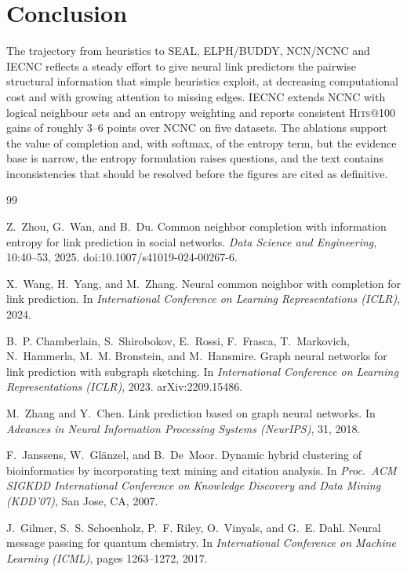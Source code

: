 \documentclass[11pt,a4paper]{article}
\makeatletter
\newcommand{\hits}{\textsc{Hits}@100}
\makeatother
\begin{document}
\section{Conclusion}
The trajectory from heuristics to SEAL, ELPH/BUDDY, NCN/NCNC and IECNC reflects a steady effort to give neural link predictors
the pairwise structural information that simple heuristics exploit, at decreasing computational cost
and with growing attention to missing edges. IECNC extends NCNC with logical neighbour sets and an entropy
weighting and reports consistent \hits{} gains of roughly 3--6 points over NCNC on five datasets. The ablations support the value of
completion and, with softmax, of the entropy term, but the evidence base is narrow, the entropy formulation raises
questions, and the text contains inconsistencies that should be resolved before the figures are cited as definitive.

\begin{thebibliography}{99}\small
\setlength{\itemsep}{0.2em}

Z.~Zhou, G.~Wan, and B.~Du.
\newblock Common neighbor completion with information entropy for link prediction in social networks.
\newblock \emph{Data Science and Engineering}, 10:40--53, 2025.
\newblock doi:10.1007/s41019-024-00267-6.

X.~Wang, H.~Yang, and M.~Zhang.
\newblock Neural common neighbor with completion for link prediction.
\newblock In \emph{International Conference on Learning Representations (ICLR)}, 2024.

B.~P. Chamberlain, S.~Shirobokov, E.~Rossi, F.~Frasca, T.~Markovich, N.~Hammerla, M.~M. Bronstein, and M.~Hansmire.
\newblock Graph neural networks for link prediction with subgraph sketching.
\newblock In \emph{International Conference on Learning Representations (ICLR)}, 2023.
\newblock arXiv:2209.15486.

M.~Zhang and Y.~Chen.
\newblock Link prediction based on graph neural networks.
\newblock In \emph{Advances in Neural Information Processing Systems (NeurIPS)}, 31, 2018.

F.~Janssens, W.~Gl\"anzel, and B.~De~Moor.
\newblock Dynamic hybrid clustering of bioinformatics by incorporating text mining and citation analysis.
\newblock In \emph{Proc.\ ACM SIGKDD International Conference on Knowledge Discovery and Data Mining (KDD'07)}, San Jose, CA, 2007.

J.~Gilmer, S.~S. Schoenholz, P.~F. Riley, O.~Vinyals, and G.~E. Dahl.
\newblock Neural message passing for quantum chemistry.
\newblock In \emph{International Conference on Machine Learning (ICML)}, pages 1263--1272, 2017.

\end{thebibliography}
\end{document}
